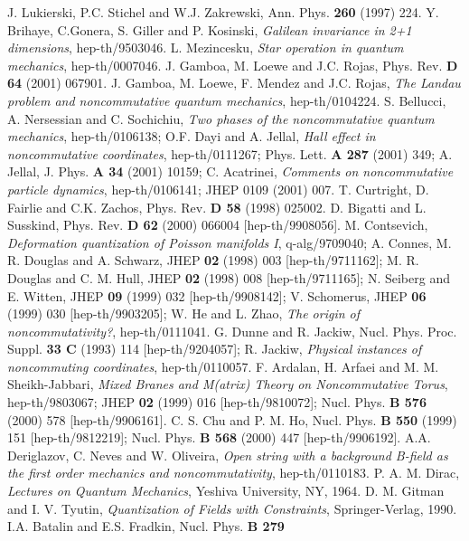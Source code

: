 \documentclass[paper a4]{article}
\begin{document}
\begin{thebibliography}{nn}
\bibitem{} J. Lukierski, P.C. Stichel and W.J. Zakrewski,
Ann. Phys. {\bf 260} (1997) 224.
\bibitem{} Y. Brihaye, C.Gonera, S. Giller and P. Kosinski,
{\em Galilean invariance in 2+1 dimensions}, hep-th/9503046.
\bibitem{} L. Mezincesku, {\em Star operation in quantum mechanics},
hep-th/0007046.
\bibitem{} J. Gamboa, M. Loewe and J.C. Rojas, Phys. Rev. {\bf D 64}
(2001) 067901.
\bibitem{} J. Gamboa, M. Loewe, F. Mendez and J.C. Rojas,
{\em The Landau problem and noncommutative quantum mechanics},
hep-th/0104224.
\bibitem{} S. Bellucci, A. Nersessian and C. Sochichiu, {\em Two phases
of the noncommutative quantum mechanics}, hep-th/0106138;
\bibitem{} O.F. Dayi and A. Jellal, {\em Hall effect in noncommutative
coordinates}, hep-th/0111267; Phys. Lett. {\bf A 287} (2001) 349;
A. Jellal, J. Phys. {\bf A 34} (2001) 10159;
C. Acatrinei, {\em Comments on noncommutative particle dynamics},
hep-th/0106141; JHEP 0109 (2001) 007.
\bibitem{} T. Curtright, D. Fairlie and C.K. Zachos, Phys. Rev.
{\bf D 58} (1998) 025002.
\bibitem{} D. Bigatti and L. Susskind, Phys. Rev. {\bf D 62} (2000)
066004 [hep-th/9908056].
\bibitem{} M. Contsevich, {\em Deformation quantization of Poisson
manifolds I}, q-alg/9709040;
A. Connes, M. R. Douglas and A. Schwarz,
JHEP {\bf 02} (1998) 003 [hep-th/9711162];
M. R. Douglas and C. M. Hull,
JHEP {\bf 02} (1998) 008 [hep-th/9711165];
N. Seiberg and E. Witten,
JHEP {\bf 09} (1999) 032 [hep-th/9908142];
V. Schomerus, JHEP {\bf 06} (1999) 030 [hep-th/9903205];
W. He and L. Zhao, {\em The origin of noncommutativity?},
hep-th/0111041.
\bibitem{} G. Dunne and R. Jackiw, Nucl. Phys. Proc. Suppl.
{\bf 33 C} (1993) 114 [hep-th/9204057];
R. Jackiw, {\em Physical instances of noncommuting coordinates},
hep-th/0110057.
\bibitem{} F. Ardalan, H. Arfaei and M. M. Sheikh-Jabbari,
{\em Mixed Branes and M(atrix) Theory on Noncommutative Torus},
hep-th/9803067; JHEP {\bf 02} (1999) 016 [hep-th/9810072];
Nucl. Phys. {\bf B 576} (2000) 578 [hep-th/9906161].
\bibitem{} C. S. Chu and P. M. Ho,
Nucl. Phys. {\bf B 550} (1999) 151 [hep-th/9812219];
Nucl. Phys. {\bf B 568} (2000) 447 [hep-th/9906192].
\bibitem{} A.A. Deriglazov, C. Neves and W. Oliveira, {\em Open string
with a background B-field as the first order mechanics and
noncommutativity}, hep-th/0110183.
\bibitem{} P. A. M. Dirac, {\em Lectures on Quantum Mechanics},
Yeshiva University, NY, 1964.
\bibitem{} D. M. Gitman and I. V. Tyutin, {\em Quantization of Fields
with Constraints}, Springer-Verlag, 1990.
\bibitem{} I.A. Batalin and E.S. Fradkin, Nucl. Phys. {\bf B 279}

\end{thebibliography}
\end{document}
